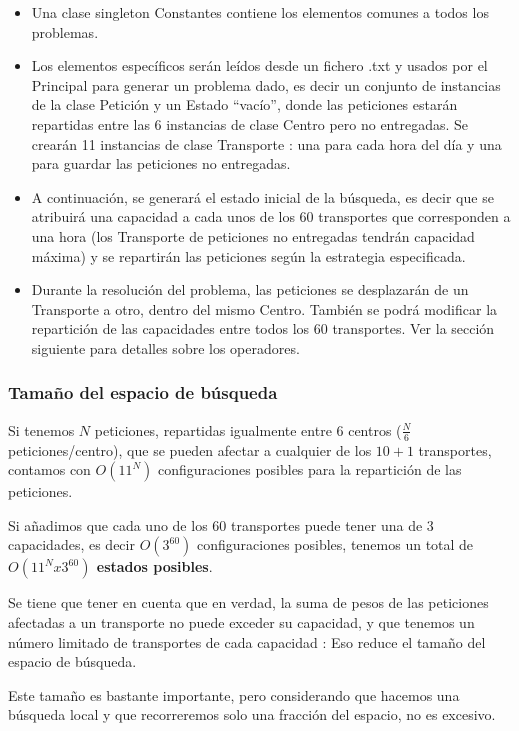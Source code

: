 \documentclass{article}
\begin{document}
\begin{itemize}
\item Una clase singleton Constantes contiene los elementos comunes a todos los
problemas.
\item Los elementos específicos serán leídos desde un fichero .txt y usados por
el Principal para generar un problema dado, es decir un conjunto de instancias
de la clase Petición y un Estado ``vacío'', donde las peticiones estarán
repartidas entre las 6 instancias de clase Centro pero no entregadas. Se crearán
11 instancias de clase Transporte : una para cada hora del día y una para
guardar las peticiones no entregadas.
\item A continuación, se generará el estado inicial de la búsqueda, es decir que
se atribuirá una capacidad a cada unos de los 60 transportes que corresponden a
una hora (los Transporte de peticiones no entregadas tendrán capacidad máxima) y
se repartirán las peticiones según la estrategia especificada.
\item Durante la resolución del problema, las peticiones se desplazarán de un
Transporte a otro, dentro del mismo Centro. También se podrá modificar la
repartición de las capacidades entre todos los 60 transportes. Ver la sección
siguiente para detalles sobre los operadores.
\end{itemize}

\subsubsection{Tamaño del espacio de búsqueda}

Si tenemos $N$ peticiones, repartidas igualmente entre 6 centros ($\frac{N}{6}$
peticiones/centro), que se pueden afectar a cualquier de los $10+1$ transportes,
contamos con $O(11^N)$ configuraciones posibles para la repartición de las
peticiones.

Si añadimos que cada uno de los 60 transportes puede tener una de 3 capacidades,
es decir $O(3^{60})$ configuraciones posibles, tenemos un total de
\textbf{$O(11^Nx3^{60})$ estados posibles}.

Se tiene que tener en cuenta que en verdad, la suma de pesos de las peticiones
afectadas a un transporte no puede exceder su capacidad, y que tenemos un número
limitado de transportes de cada capacidad : Eso reduce el tamaño del espacio de
búsqueda.

Este tamaño es bastante importante, pero considerando que hacemos una búsqueda
local y que recorreremos solo una fracción del espacio, no es excesivo.
\end{document}
